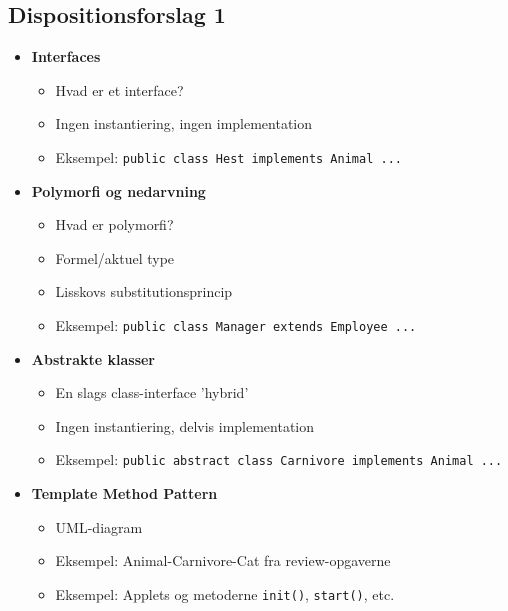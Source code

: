 \subsection{Dispositionsforslag 1}

\begin{itemize}
    \item \textbf{Interfaces}
    \begin{itemize}
        \item Hvad er et interface?
        \item Ingen instantiering, ingen implementation
        \item Eksempel: \verb|public class Hest implements Animal ...|
    \end{itemize}
    
    \item \textbf{Polymorfi og nedarvning}
    \begin{itemize}
        \item Hvad er polymorfi?
        \item Formel/aktuel type
        \item Lisskovs substitutionsprincip
        \item Eksempel: \verb|public class Manager extends Employee ...|
    \end{itemize}
    
    \item \textbf{Abstrakte klasser}
    \begin{itemize}
        \item En slags class-interface 'hybrid'
        \item Ingen instantiering, delvis implementation
        \item Eksempel: \verb|public abstract class Carnivore implements Animal ...|
    \end{itemize}
    
    \item \textbf{Template Method Pattern}
    \begin{itemize}
        \item UML-diagram
        \item Eksempel: Animal-Carnivore-Cat fra review-opgaverne
        \item Eksempel: Applets og metoderne \verb|init()|, \verb|start()|, etc.
    \end{itemize}
    
\end{itemize}
